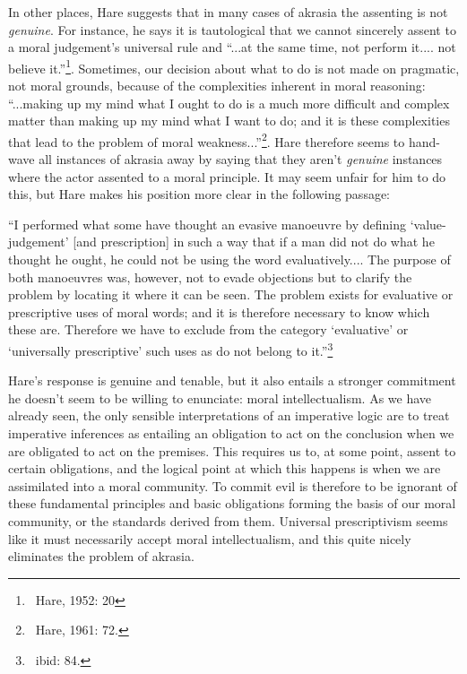 \documentclass[12pt]{article}
\begin{document}
In other places, Hare suggests that in many cases of akrasia the assenting is not \textit{genuine}. For instance, he says it is tautological that we cannot sincerely assent to a moral judgement's universal rule and ``...at the same time, not perform it.... not believe it.''\footnote{~Hare, 1952: 20}. Sometimes, our decision about what to do is not made on pragmatic, not moral grounds, because of the complexities inherent in moral reasoning: ``...making up my mind what I ought to do is a much more difficult and complex matter than making up my mind what I want to do; and it is these complexities that lead to the problem of moral weakness...''\footnote{~Hare, 1961: 72.}. Hare therefore seems to hand-wave all instances of akrasia away by saying that they aren't \textit{genuine} instances where the actor assented to a moral principle. It may seem unfair for him to do this, but Hare makes his position more clear in the following passage:

\begin{displayquote}
``I performed what some have thought an evasive manoeuvre by defining `value-judgement' [and prescription] in such a way that if a man did not do what he thought he ought, he could not be using the word evaluatively.... The purpose of both manoeuvres was, however, not to evade objections but to clarify the problem by locating it where it can be seen. The problem exists for evaluative or prescriptive uses of moral words; and it is therefore necessary to know which these are. Therefore we have to exclude from the category `evaluative' or `universally prescriptive' such uses as do not belong to it.''\footnote{~ibid: 84.}
\end{displayquote}

Hare's response is genuine and tenable, but it also entails a stronger commitment he doesn't seem to be willing to enunciate: moral intellectualism. As we have already seen, the only sensible interpretations of an imperative logic are to treat imperative inferences as entailing an obligation to act on the conclusion when we are obligated to act on the premises. This requires us to, at some point, assent to certain obligations, and the logical point at which this happens is when we are assimilated into a moral community. To commit evil is therefore to be ignorant of these fundamental principles and basic obligations forming the basis of our moral community, or the standards derived from them. Universal prescriptivism seems like it must necessarily accept moral intellectualism, and this quite nicely eliminates the problem of akrasia.
\end{document}
